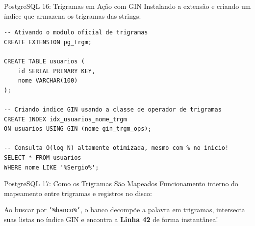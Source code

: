 \documentclass[9pt]{beamer}
\begin{document}
\begin{frame}[fragile]{PostgreSQL 16: Trigramas em Ação com GIN}
    Instalando a extensão e criando um índice que armazena os trigramas das strings:
    
    \vspace{0.2cm}
    \begin{lstlisting}[basicstyle=\ttfamily\scriptsize]
-- Ativando o modulo oficial de trigramas
CREATE EXTENSION pg_trgm;

CREATE TABLE usuarios (
    id SERIAL PRIMARY KEY,
    nome VARCHAR(100)
);

-- Criando indice GIN usando a classe de operador de trigramas
CREATE INDEX idx_usuarios_nome_trgm 
ON usuarios USING GIN (nome gin_trgm_ops);

-- Consulta O(log N) altamente otimizada, mesmo com % no inicio!
SELECT * FROM usuarios 
WHERE nome LIKE '%Sergio%';
    \end{lstlisting}
\end{frame}

\begin{frame}{PostgreSQL 17: Como os Trigramas São Mapeados}
    Funcionamento interno do mapeamento entre trigramas e registros no disco:
    
    \vspace{0.3cm}
    \begin{center}
    \end{center}
    
    \vspace{0.3cm}
    Ao buscar por \texttt{'\%banco\%'}, o banco decompõe a palavra em trigramas, intersecta suas listas no índice GIN e encontra a \textbf{Linha 42} de forma instantânea!
\end{frame}
\end{document}
